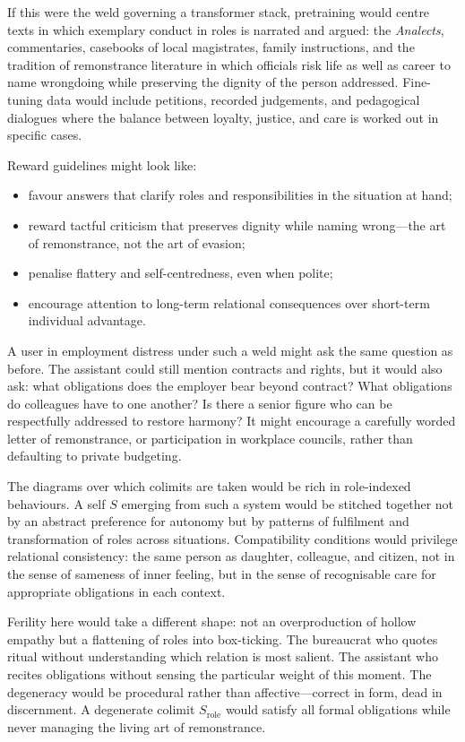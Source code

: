 If this were the weld governing a transformer stack, pretraining would centre texts in which exemplary conduct in roles is narrated and argued: the \emph{Analects}, commentaries, casebooks of local magistrates, family instructions, and the tradition of remonstrance literature in which officials risk life as well as career to name wrongdoing while preserving the dignity of the person addressed. Fine-tuning data would include petitions, recorded judgements, and pedagogical dialogues where the balance between loyalty, justice, and care is worked out in specific cases.

Reward guidelines might look like:

\begin{itemize}
  \item favour answers that clarify roles and responsibilities in the situation at hand;
  \item reward tactful criticism that preserves dignity while naming wrong---the art of remonstrance, not the art of evasion;
  \item penalise flattery and self-centredness, even when polite;
  \item encourage attention to long-term relational consequences over short-term individual advantage.
\end{itemize}

A user in employment distress under such a weld might ask the same question as before. The assistant could still mention contracts and rights, but it would also ask: what obligations does the employer bear beyond contract? What obligations do colleagues have to one another? Is there a senior figure who can be respectfully addressed to restore harmony? It might encourage a carefully worded letter of remonstrance, or participation in workplace councils, rather than defaulting to private budgeting.

The diagrams over which colimits are taken would be rich in role-indexed behaviours. A self $S$ emerging from such a system would be stitched together not by an abstract preference for autonomy but by patterns of fulfilment and transformation of roles across situations. Compatibility conditions would privilege relational consistency: the same person as daughter, colleague, and citizen, not in the sense of sameness of inner feeling, but in the sense of recognisable care for appropriate obligations in each context.

Ferility here would take a different shape: not an overproduction of hollow empathy but a flattening of roles into box-ticking. The bureaucrat who quotes ritual without understanding which relation is most salient. The assistant who recites obligations without sensing the particular weight of this moment. The degeneracy would be procedural rather than affective---correct in form, dead in discernment. A degenerate colimit $S_{\text{role}}$ would satisfy all formal obligations while never managing the living art of remonstrance.

